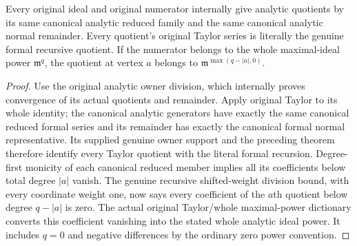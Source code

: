\begin{theorem}
\label{hir:actual-original-canonical-analytic-filtered-division}
\leanok
Every original ideal and original numerator internally give analytic
quotients by its same canonical analytic reduced family and the same
canonical analytic normal remainder. Every quotient's original Taylor
series is literally the genuine formal recursive quotient. If the
numerator belongs to the whole maximal-ideal power $\mathfrak m^q$,
the quotient at vertex $a$ belongs to
$\mathfrak m^{\max(q-|a|,0)}$.
\end{theorem}
\begin{proof}
Use the original analytic owner division, which internally proves
convergence of its actual quotients and remainder. Apply original Taylor
to its whole identity; the canonical analytic generators have exactly
the same canonical reduced formal series and its remainder has exactly
the canonical formal normal representative. Its supplied genuine owner
support and the preceding theorem therefore identify every Taylor
quotient with the literal formal recursion. Degree-first monicity of
each canonical reduced member implies all its coefficients below total
degree $|a|$ vanish. The genuine recursive shifted-weight division bound,
with every coordinate weight one, now says every coefficient of the
$a$th quotient below degree $q-|a|$ is zero. The actual original
Taylor/whole maximal-power dictionary converts this coefficient
vanishing into the stated whole analytic ideal power. It includes
$q=0$ and negative differences by the ordinary zero power convention.
\end{proof}

